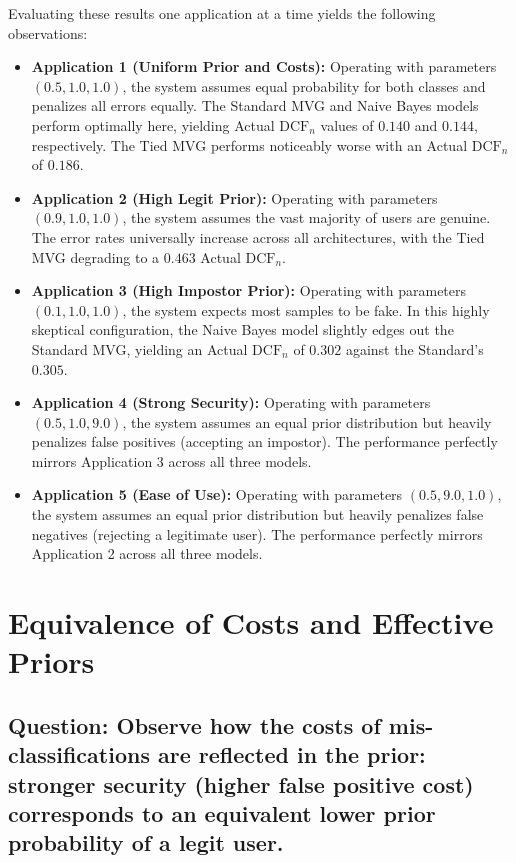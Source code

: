 Evaluating these results one application at a time yields the following observations:

\begin{itemize}
    \item \textbf{Application 1 (Uniform Prior and Costs):} Operating with parameters $(0.5, 1.0, 1.0)$, the system assumes equal probability for both classes and penalizes all errors equally. The Standard MVG and Naive Bayes models perform optimally here, yielding Actual $\text{DCF}_n$ values of $0.140$ and $0.144$, respectively. The Tied MVG performs noticeably worse with an Actual $\text{DCF}_n$ of $0.186$.
    
    \item \textbf{Application 2 (High Legit Prior):} Operating with parameters $(0.9, 1.0, 1.0)$, the system assumes the vast majority of users are genuine. The error rates universally increase across all architectures, with the Tied MVG degrading to a $0.463$ Actual $\text{DCF}_n$.
    
    \item \textbf{Application 3 (High Impostor Prior):} Operating with parameters $(0.1, 1.0, 1.0)$, the system expects most samples to be fake. In this highly skeptical configuration, the Naive Bayes model slightly edges out the Standard MVG, yielding an Actual $\text{DCF}_n$ of $0.302$ against the Standard's $0.305$.
    
    \item \textbf{Application 4 (Strong Security):} Operating with parameters $(0.5, 1.0, 9.0)$, the system assumes an equal prior distribution but heavily penalizes false positives (accepting an impostor). The performance perfectly mirrors Application 3 across all three models.
    
    \item \textbf{Application 5 (Ease of Use):} Operating with parameters $(0.5, 9.0, 1.0)$, the system assumes an equal prior distribution but heavily penalizes false negatives (rejecting a legitimate user). The performance perfectly mirrors Application 2 across all three models.
\end{itemize}

\section{Equivalence of Costs and Effective Priors}

\subsection*{Question: Observe how the costs of mis-classifications are reflected in the prior: stronger security (higher false positive cost) corresponds to an equivalent lower prior probability of a legit user.}

